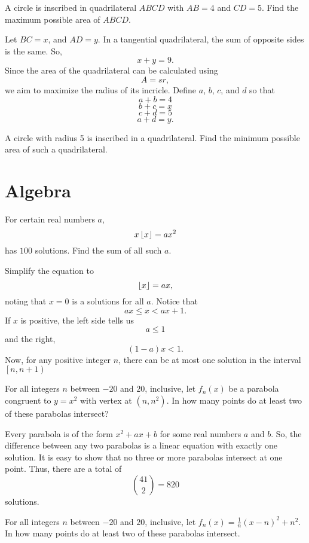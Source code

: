 \documentclass[11pt]{scrartcl}
\begin{document}
\begin{problem}
    A circle is inscribed in quadrilateral $ABCD$ with $AB = 4$ and $CD = 5$. Find the maximum possible area of $ABCD$.
\end{problem}

Let $BC = x$, and $AD = y$. In a tangential quadrilateral, the sum of opposite sides is the same. So,
\[x + y = 9.\]
Since the area of the quadrilateral can be calculated using
\[A = sr,\]
we aim to maximize the radius of its incricle. Define $a$, $b$, $c$, and $d$ so that
\[a + b = 4\]
\[b + c = x\]
\[c + d = 5\]
\[a + d = y.\]

\begin{problem}
    A circle with radius 5 is inscribed in a quadrilateral. Find the minimum possible area of such a quadrilateral.
\end{problem}

\section{Algebra}

\begin{problem}
    For certain real numbers $a$,
    \[x\left\lfloor x \right\rfloor = ax^{2}\]
    has $100$ solutions. Find the sum of all such $a$.
\end{problem}

Simplify the equation to
\[\left\lfloor x \right\rfloor = ax,\]
noting that $x = 0$ is a solutions for all $a$. Notice that
\[ax \leq x < ax + 1.\]
If $x$ is positive, the left side tells us
\[a \leq 1\]
and the right,
\[(1 - a)x < 1.\]
Now, for any positive integer $n$, there can be at most one solution in the interval $\left[n, n + 1\right)$

\begin{problem}
    For all integers $n$ between $-20$ and $20$, inclusive, let $f_{n}(x)$ be a parabola congruent to $y = x^{2}$ with vertex at $(n, n^{2})$. In how many points do at least two of these parabolas intersect?
\end{problem}

Every parabola is of the form $x^{2} + ax + b$ for some real numbers $a$ and $b$. So, the difference between any two parabolas is a linear equation with exactly one solution. It is easy to show that no three or more parabolas intersect at one point. Thus, there are a total of
\[{41 \choose 2} = \boxed{820}\]
solutions.

\begin{problem}
    For all integers $n$ between $-20$ and $20$, inclusive, let $f_{n}(x) = \frac{1}{n}(x - n)^{2} + n^{2}$. In how many points do at least two of these parabolas intersect.
\end{problem}
\end{document}
